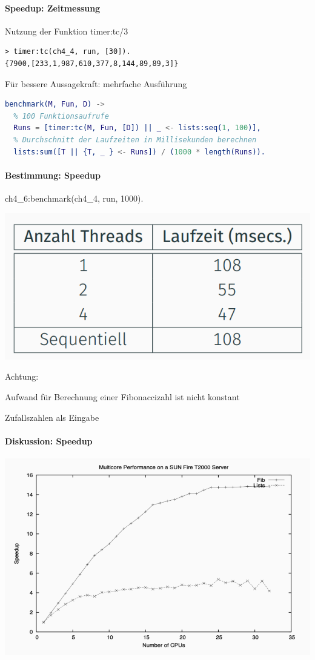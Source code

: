 \documentclass[10pt]{article}
\begin{document}
  \paragraph{Speedup: Zeitmessung}
  
  Nutzung der Funktion timer:tc/3
  \begin{lstlisting}
> timer:tc(ch4_4, run, [30]).
{7900,[233,1,987,610,377,8,144,89,89,3]}
\end{lstlisting}
  Für bessere Aussagekraft: mehrfache Ausführung
  \begin{lstlisting}[language=erlang]
benchmark(M, Fun, D) ->
  % 100 Funktionsaufrufe
  Runs = [timer:tc(M, Fun, [D]) || _ <- lists:seq(1, 100)],
  % Durchschnitt der Laufzeiten in Millisekunden berechnen
  lists:sum([T || {T, _ } <- Runs]) / (1000 * length(Runs)).
\end{lstlisting}
  
  \paragraph{Bestimmung: Speedup}
  
  ch4\_6:benchmark(ch4\_4, run, 1000).
  \begin{center}
    \includegraphics[width=0.4\linewidth]{Assets/Programmierparadigmen-Speedup-Bestimmung}
  \end{center}
  \color{orange} Achtung: \color{black}
  \begin{itemize*}
    \item Aufwand für Berechnung einer Fibonaccizahl ist nicht konstant
    \item Zufallszahlen als Eingabe
  \end{itemize*}
  
  \paragraph{Diskussion: Speedup}
  
  \begin{center}
    \includegraphics[width=0.4\linewidth]{Assets/Programmierparadigmen-Speedup-Diskussion}
  \end{center}
  
\end{document}
